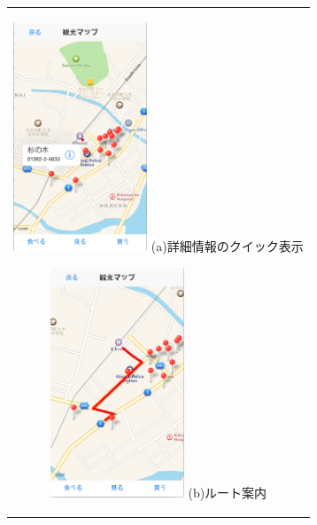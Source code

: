 \begin{figure}[htbp]
  \begin{center}
    \begin{tabular}{c}

      \begin{minipage}{0.33\hsize}
        \begin{center}
\includegraphics[width=4cm, bb=0 0 322 550]{5.3_map1.png}
          \hspace{1cm} (a)詳細情報のクイック表示
        \end{center}
      \end{minipage}

      \begin{minipage}{0.33\hsize}
        \begin{center}
\includegraphics[width=4cm, bb=0 0 321 550]{5.3_map2.png}
          \hspace{1cm} (b)ルート案内
        \end{center}
      \end{minipage}


\end{tabular}
\end{center}
\end{figure}
